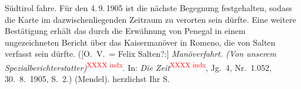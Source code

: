 \begin{ledgroupsized}[t]{13cm}
{{{{{                           Südtirol fahre. Für den 4. 9. 1905 ist
                        die nächste Begegnung festgehalten, sodass die Karte im dazwischenliegenden
                        Zeitraum zu verorten sein dürfte. Eine weitere Bestätigung erhält das durch
                        die Erwähnung von Penegal in einem
                        ungezeichneten Bericht über das Kaisermanöver in Romeno, die von Salten verfasst sein dürfte. ([O. V. = Felix Salten?:] \emph{Manöverfahrt. (Von unserem
                              Spezialberichterstatter)}\textcolor{red}{\textsuperscript{XXXX indx}}. In: \emph{Die
                              Zeit}\textcolor{red}{\textsuperscript{XXXX indx}}, Jg. 4, Nr. 1.052,
                              30. 8. 1905, S. 2.)}}}\label{K_L03411-1h} (Mendel).}}\pend
           \pstart
           herzlichst Ihr \spacefill\mbox{S.}\pend
           
         
         \endnumbering{}\end{ledgroupsized}  \newcommand{\dateiname}{L03411}\newcommand{\titel}{Felix Salten an Arthur Schnitzler, [zwischen 25. 8. und 3. 9. 1905?]}\newcommand{\editorInnen}{Martin Anton Müller und Laura Untner}
      